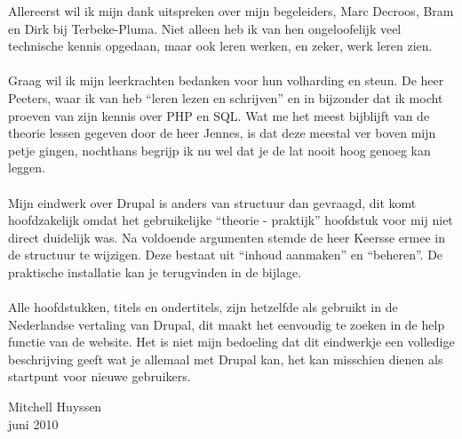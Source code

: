 Allereerst wil ik mijn dank uitspreken over mijn begeleiders, Marc Decroos, Bram
en Dirk bij Terbeke-Pluma. Niet alleen heb ik van hen ongeloofelijk veel technische kennis opgedaan, maar
ook leren werken, en zeker, werk leren zien.
\\\\
Graag wil ik mijn leerkrachten bedanken voor hun volharding en steun. De heer
Peeters, waar ik van heb ``leren lezen en schrijven'' en in bijzonder dat ik mocht
proeven van zijn kennis over PHP en SQL. Wat me het meest bijblijft van de
theorie lessen gegeven door de heer Jennes, is dat deze meestal ver boven mijn
petje gingen, nochthans begrijp ik nu wel dat je de lat nooit hoog genoeg kan
leggen.
\\\\
Mijn eindwerk over Drupal is anders van structuur dan gevraagd, dit komt
hoofdzakelijk omdat het gebruikelijke ``theorie - praktijk'' hoofdstuk voor mij
niet direct duidelijk was. Na voldoende argumenten stemde de heer Keersse ermee in de
structuur te wijzigen. Deze bestaat uit ``inhoud aanmaken'' en ``beheren''. De
praktische installatie kan je terugvinden in de bijlage. 
\\\\
Alle hoofdstukken, titels en ondertitels, zijn hetzelfde als gebruikt in de
Nederlandse vertaling van Drupal, dit maakt het eenvoudig te zoeken in de help
functie van de website. Het is niet mijn bedoeling dat dit eindwerkje een
volledige beschrijving geeft wat je allemaal met Drupal kan, het kan misschien dienen als startpunt voor
nieuwe gebruikers.

\begin{flushright}
Mitchell Huyssen\\juni 2010
\end{flushright}

